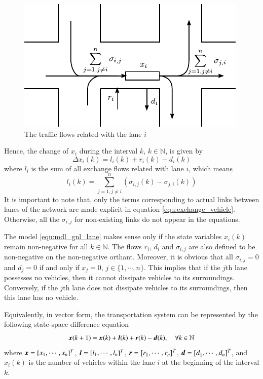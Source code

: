 \documentclass[preprint,authoryear,12pt]{elsarticle}
\renewcommand{\vec}[1]{\mbox{\boldmath$#1$}}
\begin{document}
\begin{figure}[ht]
  \centering
  \includegraphics{pics/flows}
  \caption{The traffic flows related with the lane $i$}
  \label{fig:flows}
\end{figure}

Hence, the change of $x_i$ during the interval
$k$, $k\in\mathbb{N}$, is given by
\begin{equation}\label{equ:mdl_gnl_lane}
\Delta x_i(k) = l_i(k)+r_i(k)-d_i(k)
\end{equation}
where $l_i$ is the sum of all exchange flows related with lane $i$,
which means
\begin{equation}\label{equ:exchange_vehicle}
 l_i(k)=\sum_{j=1,j\neq i}^{n}(\sigma_{i,j}(k)-\sigma_{j,i}(k))
\end{equation}
It is important to note that, only the terms corresponding to actual
links between lanes  of the network are made explicit in  equation
\eqref{equ:exchange_vehicle}. Otherwise, all the $\sigma_{i,j}$ for
non-existing links do not appear in the equations.


The model \eqref{equ:mdl_gnl_lane} makes sense only if the state
variables $x_i(k)$ remain non-negative for all $k\in \mathbb{N}$. The
flows $r_i$, $d_{i}$ and $\sigma_{i,j}$ are also defined
to be non-negative on the non-negative orthant. Moreover, it is
obvious that all $\sigma_{i,j}=0$ and $d_{j}=0$ if and only if
$x_j=0$, $j\in\{1,\cdots,n\}$. This implies that if the $j$th lane
possesses no vehicles, then it cannot dissipate vehicles to its
surroundings. Conversely, if the $j$th lane does not dissipate
vehicles to its surroundings, then this lane has no vehicle.

Equivalently, in vector form, the transportation system can be
represented by the following state-space difference equation
\begin{equation}\label{equ:mdl_gnl}
\vec{x}(k+1)=\vec{x}(k)+\vec{l}(k)+\vec{r}(k)-\vec{d}(k),\quad \forall k\in\mathbb{N}
\end{equation}
where $\vec{x}=[x_1,\cdots,x_n]^T$, $\vec{l}=[l_1,\cdots,l_n]^T$,
$\vec{r}=[r_1,\cdots,r_n]^T$, $\vec{d}=[d_1,\cdots,d_n]^T$, and
$x_i(k)$ is the number of vehicles within the lane $i$ at the
beginning of the interval $k$.
\end{document}
